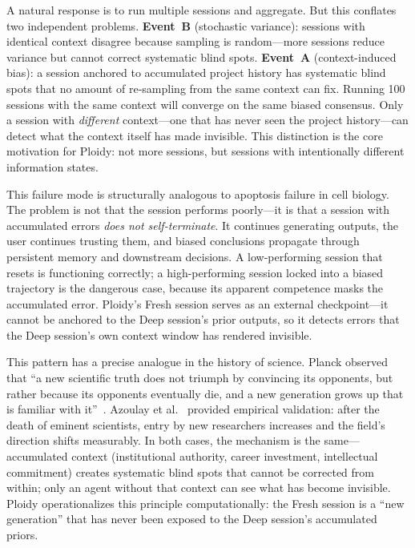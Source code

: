 \documentclass[11pt]{article}
\begin{document}
A natural response is to run multiple sessions and aggregate. But this conflates two independent problems. \textbf{Event~B} (stochastic variance): sessions with identical context disagree because sampling is random---more sessions reduce variance but cannot correct systematic blind spots. \textbf{Event~A} (context-induced bias): a session anchored to accumulated project history has systematic blind spots that no amount of re-sampling from the same context can fix. Running 100 sessions with the same context will converge on the same biased consensus. Only a session with \emph{different} context---one that has never seen the project history---can detect what the context itself has made invisible. This distinction is the core motivation for Ploidy: not more sessions, but sessions with intentionally different information states.

This failure mode is structurally analogous to apoptosis failure in cell biology. The problem is not that the session performs poorly---it is that a session with accumulated errors \emph{does not self-terminate}. It continues generating outputs, the user continues trusting them, and biased conclusions propagate through persistent memory and downstream decisions. A low-performing session that resets is functioning correctly; a high-performing session locked into a biased trajectory is the dangerous case, because its apparent competence masks the accumulated error. Ploidy's Fresh session serves as an external checkpoint---it cannot be anchored to the Deep session's prior outputs, so it detects errors that the Deep session's own context window has rendered invisible.

This pattern has a precise analogue in the history of science. Planck observed that ``a new scientific truth does not triumph by convincing its opponents, but rather because its opponents eventually die, and a new generation grows up that is familiar with it''~\citep{planck1950}. Azoulay et al.~\citep{azoulay2019} provided empirical validation: after the death of eminent scientists, entry by new researchers increases and the field's direction shifts measurably. In both cases, the mechanism is the same---accumulated context (institutional authority, career investment, intellectual commitment) creates systematic blind spots that cannot be corrected from within; only an agent without that context can see what has become invisible. Ploidy operationalizes this principle computationally: the Fresh session is a ``new generation'' that has never been exposed to the Deep session's accumulated priors.
\end{document}
